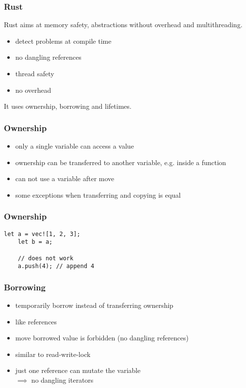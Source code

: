 \documentclass[xcolor=colortbl
]{beamer}
\begin{document}
\begin{frame}
    \frametitle{Rust}
    
    Rust aims at memory safety, abstractions without overhead and multithreading.
    
    \begin{itemize}
        \item detect problems at compile time
        \item no dangling references        
        \item thread safety
        \item no overhead
    \end{itemize}
    It uses ownership, borrowing and lifetimes.
\end{frame}


\begin{frame}
    \frametitle{Ownership}
    
    \begin{itemize}
        \item only a single variable can access a value
        \item ownership can be transferred to another variable, e.g. inside a function
        \item can not use a variable after move
        \item some exceptions when transferring and copying is equal
    \end{itemize}
\end{frame}


\begin{frame}[fragile]
    \frametitle{Ownership}
    \begin{lstlisting}[frame=single]
    let a = vec![1, 2, 3];
    let b = a;
    
    // does not work
    a.push(4); // append 4
    \end{lstlisting}
\end{frame}


\begin{frame}
    \frametitle{Borrowing}
    
    \begin{itemize}
        \item temporarily borrow instead of transferring ownership
        \item like references
        \item move borrowed value is forbidden (no dangling references)
        \item similar to read-write-lock
        \item just one reference can mutate the variable \\
            $ \implies $ no dangling iterators
    \end{itemize}
\end{frame}
\end{document}
